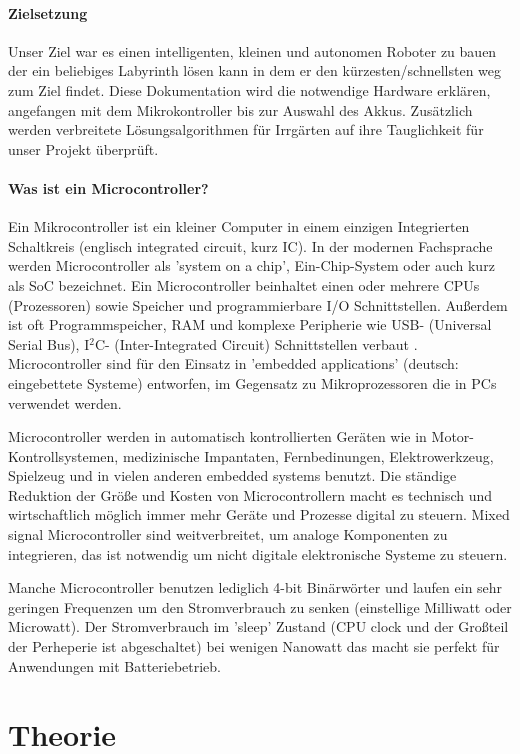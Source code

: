 \documentclass[12pt]{article}
\begin{document}
\paragraph{Zielsetzung} Unser Ziel war es einen intelligenten, kleinen und autonomen Roboter zu bauen der ein beliebiges Labyrinth lösen kann in dem er den kürzesten/schnellsten weg zum Ziel findet. Diese Dokumentation wird die notwendige Hardware erklären, angefangen mit dem Mikrokontroller bis zur Auswahl des Akkus. Zusätzlich werden verbreitete Lösungsalgorithmen für Irrgärten auf ihre Tauglichkeit für unser Projekt überprüft. 

\paragraph{Was ist ein Microcontroller?} Ein Mikrocontroller ist ein kleiner Computer in einem einzigen Integrierten Schaltkreis (englisch integrated circuit, kurz IC). In der modernen Fachsprache werden Microcontroller als 'system on a chip', Ein-Chip-System oder auch kurz als SoC bezeichnet. Ein Microcontroller beinhaltet einen oder mehrere CPUs (Prozessoren) sowie Speicher und programmierbare I/O Schnittstellen. Außerdem ist oft Programmspeicher, RAM und komplexe Peripherie wie USB- (Universal Serial Bus), I$^2$C- (Inter-Integrated Circuit) Schnittstellen verbaut . Microcontroller sind für den Einsatz in 'embedded applications' (deutsch: eingebettete Systeme) entworfen, im Gegensatz zu Mikroprozessoren die in PCs verwendet werden.

Microcontroller werden in automatisch kontrollierten Geräten wie in Motor\hyp Kontrollsystemen, medizinische Impantaten, Fernbedinungen, Elektrowerkzeug, Spielzeug und in vielen anderen embedded systems benutzt. Die ständige Reduktion der Größe und Kosten von Microcontrollern macht es technisch und wirtschaftlich möglich immer mehr Geräte und Prozesse digital zu steuern. Mixed signal Microcontroller sind weitverbreitet, um analoge Komponenten zu integrieren, das ist notwendig um nicht digitale elektronische Systeme zu steuern.

Manche Microcontroller benutzen lediglich 4-bit Binärwörter und laufen ein sehr geringen Frequenzen um den Stromverbrauch zu senken (einstellige Milliwatt oder Microwatt). Der Stromverbrauch im 'sleep' Zustand (CPU clock und der Großteil der Perheperie ist abgeschaltet) bei wenigen Nanowatt das macht sie perfekt für Anwendungen mit Batteriebetrieb.
\newpage
\section{Theorie}
\end{document}
